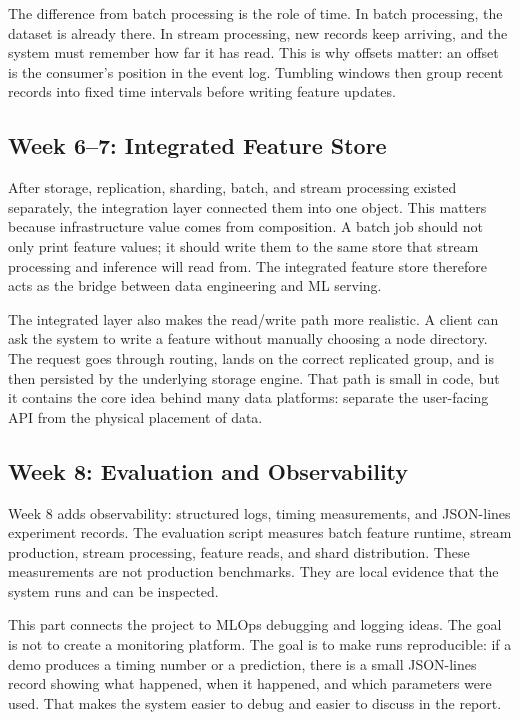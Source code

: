 The difference from batch processing is the role of time. In batch processing,
the dataset is already there. In stream processing, new records keep arriving,
and the system must remember how far it has read. This is why offsets matter:
an offset is the consumer's position in the event log. Tumbling windows then
group recent records into fixed time intervals before writing feature updates.

\subsection{Week 6--7: Integrated Feature Store}

After storage, replication, sharding, batch, and stream processing existed
separately, the integration layer connected them into one object. This matters
because infrastructure value comes from composition. A batch job should not only
print feature values; it should write them to the same store that stream
processing and inference will read from. The integrated feature store therefore
acts as the bridge between data engineering and ML serving.

The integrated layer also makes the read/write path more realistic. A client can
ask the system to write a feature without manually choosing a node directory.
The request goes through routing, lands on the correct replicated group, and is
then persisted by the underlying storage engine. That path is small in code, but
it contains the core idea behind many data platforms: separate the user-facing
API from the physical placement of data.

\subsection{Week 8: Evaluation and Observability}

Week 8 adds observability: structured logs, timing measurements, and JSON-lines
experiment records. The evaluation script measures batch feature runtime, stream
production, stream processing, feature reads, and shard distribution. These
measurements are not production benchmarks. They are local evidence that the
system runs and can be inspected.

This part connects the project to MLOps debugging and logging ideas. The goal is
not to create a monitoring platform. The goal is to make runs reproducible: if a
demo produces a timing number or a prediction, there is a small JSON-lines
record showing what happened, when it happened, and which parameters were used.
That makes the system easier to debug and easier to discuss in the report.

